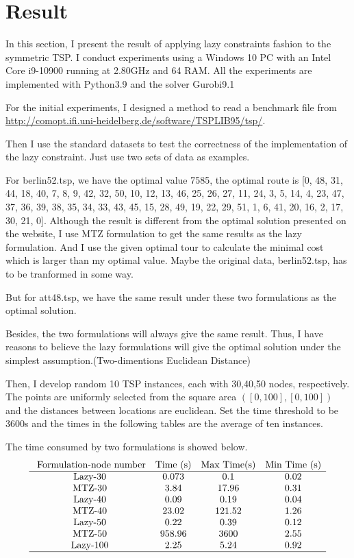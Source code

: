\documentclass[12pt,letterpaper]{article}
\begin{document}
\section{Result}\label{section-result}
In this section, I present the result of applying lazy constraints fashion to the symmetric TSP. I conduct experiments using a Windows 10 PC with an Intel Core i9-10900 running at 2.80GHz and 64 RAM. All the experiments are implemented with Python3.9 and the solver Gurobi9.1

For the initial experiments, I designed a method to read a benchmark file from \url{http://comopt.ifi.uni-heidelberg.de/software/TSPLIB95/tsp/}.

Then I use the standard datasets to test the correctness of the implementation of the lazy constraint. Just use two sets of data as examples.

For berlin52.tsp, we have the optimal value 7585,
the optimal route is [0, 48, 31, 44, 18, 40, 7, 8, 9, 42, 32, 50, 10, 12, 13, 46, 25, 26, 27, 11, 24, 3, 5, 14, 4, 23, 47, 37, 36, 39, 38, 35, 34, 33, 43, 45, 15, 28, 49, 19, 22, 29, 51, 1, 6, 41, 20, 16, 2, 17, 30, 21, 0].
Although the result is different from the optimal solution presented on the website, I use MTZ formulation to get the same results as the lazy formulation.
And I use the given optimal tour to calculate the minimal cost which is larger than my optimal value.
Maybe the original data, berlin52.tsp, has to be tranformed in some way.

But for att48.tsp, we have the same result under these two formulations as the optimal solution.

Besides, the two formulations will always give the same result. Thus, I have reasons to believe the lazy formulations will give the optimal solution under the simplest assumption.(Two-dimentions Euclidean Distance)

Then, I develop random 10 TSP instances, each with 30,40,50 nodes, respectively. The points are uniformly selected from the square area $([0,100], [0,100])$ and the distances between locations are euclidean. Set the time threshold to be 3600s and the times in the following tables are the average of ten instances.

The time consumed by two formulations is showed below.
$$
\begin{array}{cccc}
\text { Formulation-node number} & \text {Time (s)} & \text {Max Time(s)} & \text {Min Time (s)} \\
\hline \text {Lazy-30} & 0.073 & 0.1 & 0.02 \\
\text {MTZ-30} & 3.84 & 17.96 & 0.31 \\
\text {Lazy-40} & 0.09 & 0.19 & 0.04 \\
\text {MTZ-40} & 23.02 & 121.52 & 1.26\\
\text {Lazy-50} & 0.22 & 0.39  &  0.12\\
\text {MTZ-50} & 958.96 & 3600 &  2.55\\
\text {Lazy-100} & 2.25 & 5.24 &  0.92\\
\hline
\end{array}
$$
\end{document}
